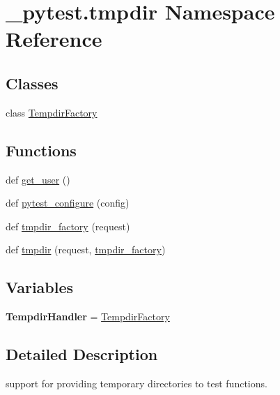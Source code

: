 \hypertarget{namespace__pytest_1_1tmpdir}{}\section{\+\_\+pytest.\+tmpdir Namespace Reference}
\label{namespace__pytest_1_1tmpdir}
\subsection*{Classes}
\begin{DoxyCompactItemize}
\item 
class \hyperlink{class__pytest_1_1tmpdir_1_1_tempdir_factory}{Tempdir\+Factory}
\end{DoxyCompactItemize}
\subsection*{Functions}
\begin{DoxyCompactItemize}
\item 
def \hyperlink{namespace__pytest_1_1tmpdir_a80baa4aa8cdd5cd6281045ca35cea7f5}{get\+\_\+user} ()
\item 
def \hyperlink{namespace__pytest_1_1tmpdir_aa9a6001be9c67be1e73b9efd97b15ab6}{pytest\+\_\+configure} (config)
\item 
def \hyperlink{namespace__pytest_1_1tmpdir_aaeb6f2c894e9b7f25d475f96a8d1d247}{tmpdir\+\_\+factory} (request)
\item 
def \hyperlink{namespace__pytest_1_1tmpdir_ad998371dbf1bf308a2fc1b20b5367ed6}{tmpdir} (request, \hyperlink{namespace__pytest_1_1tmpdir_aaeb6f2c894e9b7f25d475f96a8d1d247}{tmpdir\+\_\+factory})
\end{DoxyCompactItemize}
\subsection*{Variables}
\begin{DoxyCompactItemize}
\item 
\mbox{\label{namespace__pytest_1_1tmpdir_aa642e5204699bbaa9740f11d28219783}} 
{\bfseries Tempdir\+Handler} = \hyperlink{class__pytest_1_1tmpdir_1_1_tempdir_factory}{Tempdir\+Factory}
\end{DoxyCompactItemize}


\subsection{Detailed Description}
\begin{DoxyVerb}support for providing temporary directories to test functions.  \end{DoxyVerb}
 

